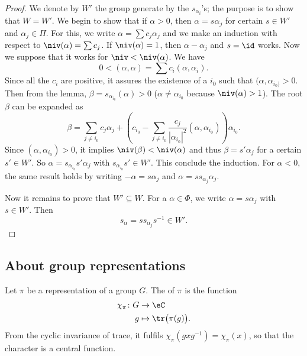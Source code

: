 \begin{proof}
We denote by $W'$ the group generate by the $s_{\alpha_i}$'s; the purpose is to show that $W=W'$. We begin to show that if $\alpha>0$, then $\alpha=s\alpha_j$ for certain $s\in W'$ and $\alpha_j\in\Pi$. For this, we write $\alpha=\sum c_j\alpha_j$ and we make an induction with respect to $\niv(\alpha)=\sum c_j$. If $\niv(\alpha)=1$, then $\alpha-\alpha_j$ and $s=\id$ works.  Now we suppose that it works for $\niv<\niv(\alpha)$. We have
\[
   0<(\alpha,\alpha)=\sum c_i(\alpha,\alpha_i).
\]
Since all the $c_i$ are positive, it assures the existence of a $i_0$ such that $(\alpha,\alpha_{i_0)}>0$. Then from the lemma, $\beta=s_{\alpha_{i_0}}(\alpha)>0$ ($\alpha\neq \alpha_{i_0}$ because $\niv(\alpha)>1$). The root $\beta$ can be expanded as
\begin{equation}
\beta=\sum_{j \neq i_0}c_j\alpha_j+\left(  c_{i_0}-\sum_{j\neq i_0}\frac{c_j}{|\alpha_{i_0}|^2}(\alpha,\alpha_{i_0})   \right)\alpha_{i_0}.
\end{equation}
Since $(\alpha,\alpha_{i_0})>0$, it implies $\niv(\beta)<\niv(\alpha)$ and thus $\beta=s'\alpha_j$ for a certain $s'\in W'$. So $\alpha=s_{\alpha_{i_0}}s'\alpha_j$ with $s_{\alpha_{i_0}}s'\in W'$. This conclude the induction. For $\alpha<0$, the same result holds by writing $-\alpha=s\alpha_j$ and $\alpha=ss_{\alpha_j}\alpha_j$.

Now it remains to prove that $W'\subseteq W$. For a $\alpha\in\Phi$, we write $\alpha=s\alpha_j$ with $s\in W'$. Then
\[
   s_{\alpha}=ss_{\alpha_j}s^{-1}\in W'.
\]
\end{proof}

\subsection{About group representations}

Let $\pi$ be a representation of a group $G$. The  of $\pi$ is the function
\begin{equation}
    \begin{aligned}
        \chi_{\pi}\colon G&\to\eC \\
        g&\mapsto \tr\big( \pi(g) \big).
    \end{aligned}
\end{equation}
From the cyclic invariance of trace, it fulfils $\chi_{\pi}(gxg^{-1})=\chi_{\pi}(x)$, so that the character is a central function.


